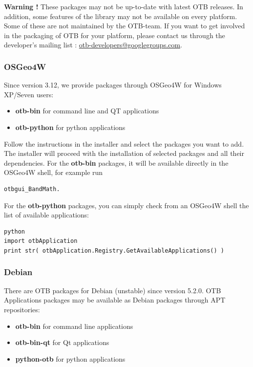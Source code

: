 \textbf{Warning !} These packages may not be up-to-date with latest OTB releases.
In addition, some features of the library may not be available on every platform.
Some of these are not maintained by the OTB-team. If you want to get involved in
the packaging of OTB for your platform, please contact us through the developer's
mailing list :
\href{mailto:otb-developers@googlegroups.com}{otb-developers@googlegroups.com}.

\subsubsection{OSGeo4W}

Since version 3.12, we provide \app packages through OSGeo4W for Windows XP/Seven users:
\begin{itemize}
\item \textbf{otb-bin} for command line and QT applications
\item \textbf{otb-python} for python applications
\end{itemize}
Follow the instructions in the installer and select the packages you want to add. The installer will proceed with the installation of selected packages and all their dependencies.
For the \textbf{otb-bin} packages, it will be available directly in the OSGeo4W shell, for example run
\begin{verbatim}
otbgui_BandMath.
\end{verbatim}
For the \textbf{otb-python} packages, you can simply check from an OSGeo4W shell the list of available applications:
\begin{verbatim}
python
import otbApplication
print str( otbApplication.Registry.GetAvailableApplications() )
\end{verbatim}

\subsubsection{Debian}

There are OTB packages for Debian (unstable) since version 5.2.0.
OTB Applications packages may be available as
Debian packages through APT repositories:
\begin{itemize}
\item \textbf{otb-bin} for command line applications
\item \textbf{otb-bin-qt} for Qt applications
\item \textbf{python-otb} for python applications
\end{itemize}

